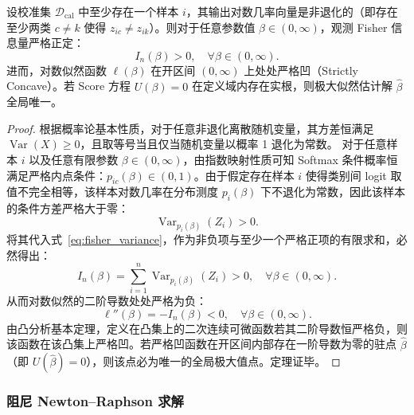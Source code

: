 \begin{thm}\label{thm:strict_concavity}
设校准集 $\mathcal{D}_{\mathrm{cal}}$ 中至少存在一个样本 $i$，其输出对数几率向量是非退化的（即存在至少两类 $c \ne k$ 使得 $z_{ic} \ne z_{ik}$）。则对于任意参数值 $\beta \in (0, \infty)$，观测 Fisher 信息量严格正定：
\begin{equation}\label{eq:fisher_positive}
I_n(\beta) > 0, \quad \forall \beta \in (0, \infty).
\end{equation}
进而，对数似然函数 $\ell(\beta)$ 在开区间 $(0, \infty)$ 上处处严格凹（Strictly Concave）。若 Score 方程 $U(\beta) = 0$ 在定义域内存在实根，则极大似然估计解 $\hat\beta$ 全局唯一。
\end{thm}

\begin{proof}
根据概率论基本性质，对于任意非退化离散随机变量，其方差恒满足 $\operatorname{Var}(X) \ge 0$，且取等号当且仅当随机变量以概率 1 退化为常数。
对于任意样本 $i$ 以及任意有限参数 $\beta \in (0, \infty)$，由指数映射性质可知 Softmax 条件概率恒满足严格内点条件：$p_{ic}(\beta) \in (0, 1)$。由于假定存在样本 $i$ 使得类别间 logit 取值不完全相等，该样本对数几率在分布测度 $p_i(\beta)$ 下不退化为常数，因此该样本的条件方差严格大于零：
\[
\operatorname{Var}_{p_i(\beta)}(Z_i) > 0.
\]
将其代入式~\eqref{eq:fisher_variance}，作为非负项与至少一个严格正项的有限求和，必然得出：
\[
I_n(\beta) = \sum_{i=1}^n \operatorname{Var}_{p_i(\beta)}(Z_i) > 0, \quad \forall \beta \in (0, \infty).
\]
从而对数似然的二阶导数处处严格为负：
\[
\ell''(\beta) = -I_n(\beta) < 0, \quad \forall \beta \in (0, \infty).
\]
由凸分析基本定理，定义在凸集上的二次连续可微函数若其二阶导数恒严格负，则该函数在该凸集上严格凹。若严格凹函数在开区间内部存在一阶导数为零的驻点 $\hat\beta$（即 $U(\hat\beta)=0$），则该点必为唯一的全局极大值点。定理证毕。
\end{proof}

\subsubsection{阻尼 Newton--Raphson 求解}

